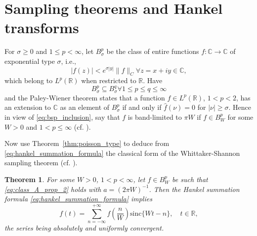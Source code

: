 \documentclass{article}
\newtheorem{theorem}{Theorem}
\begin{document}
\section{Sampling theorems and Hankel transforms}\label{sec:sampling}

For $\sigma \geq 0$ and $1 \leq p < \infty$, let $B_{\sigma}^p$ be the class
of entire functions $f : \mathbb{C} \to \mathbb{C}$ of exponential type
$\sigma$, i.e.,
\begin{equation}
  |f (z) | < e^{\sigma |y|} \|f\|_C \forall z = x + iy \in \mathbb{C},
  \label{eq:exponential_type}
\end{equation}
which belong to $L^p (\mathbb{R})$ when restricted to $\mathbb{R}$. Have
\begin{equation}
  B_{\sigma}^p \subseteq B_{\sigma}^q \forall 1 \leq p \leq q \leq \infty
  \label{eq:bsp_inclusion}
\end{equation}
and the Paley-Wiener theorem states that a function $f \in L^p (\mathbb{R})$,
$1 < p < 2$, has an extension to $\mathbb{C}$ as an element of $B_{\sigma}^p$
if and only if $\hat{f} (\nu) = 0$ for $| \nu | \geq \sigma$. Hence in view of
\eqref{eq:bsp_inclusion}, say that $f$ is band-limited to $\pi W$ if $f \in
B_W^p$ for some $W > 0$ and $1 < p \leq \infty$ (cf. {\cite{8}}).

Now use Theorem~\ref{thm:poisson_type} to deduce from
\eqref{eq:hankel_summation_formula} the classical form of the
Whittaker-Shannon sampling theorem (cf. {\cite{8}}).

\begin{theorem}
  \label{thm:hankel_shannon}For some $W > 0$, $1 < p < \infty$, let $f \in
  B_W^p$ be such that \eqref{eq:class_A_prop_2} holds with $a = (2 \pi W)^{-
  1}$. Then the Hankel summation formula \eqref{eq:hankel_summation_formula}
  implies
  \begin{equation}
    f (t) = \sum_{n = - \infty}^{+ \infty} f \left( \frac{n}{W} \right)
    \mathrm{sinc} \{Wt - n\}, \quad t \in \mathbb{R},
    \label{eq:hankel_shannon_result}
  \end{equation}
  the series being absolutely and uniformly convergent.
\end{theorem}
\end{document}

